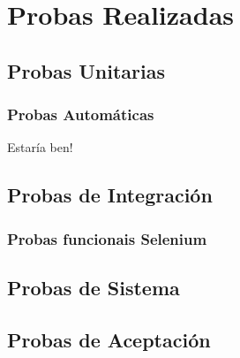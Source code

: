 \chapter{Probas Realizadas}

\section{Probas Unitarias}
  \subsection{Probas Automáticas}
  Estaría ben!

\section{Probas de Integración}
  \subsection{Probas funcionais Selenium}


\section{Probas de Sistema}

\section{Probas de Aceptación}
